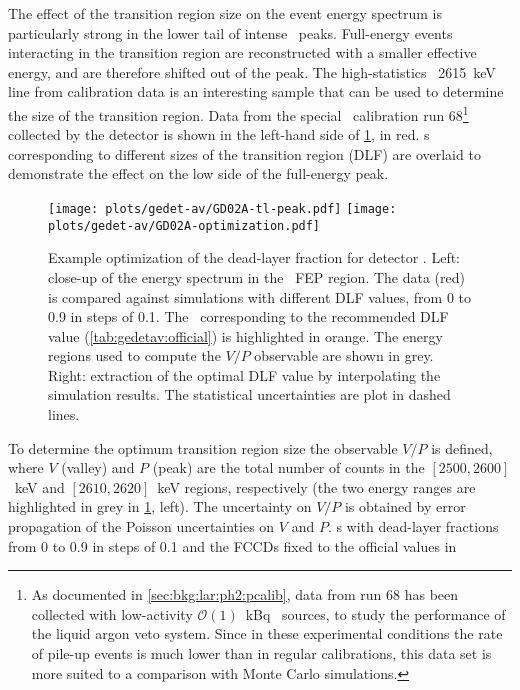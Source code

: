 The effect of the transition region size on the event energy spectrum is particularly
strong in the lower tail of intense \g\ peaks. Full-energy events interacting in the
transition region are reconstructed with a smaller effective energy, and are therefore
shifted out of the peak. The high-statistics \Tl\ 2615~keV line from calibration data is
an interesting sample that can be used to determine the size of the transition region.
Data from the special \Th\ calibration run 68\footnote{%
  As documented in \cref{sec:bkg:lar:ph2:pcalib}, data from run 68 has been collected with
  low-activity $\mathcal{O}(1)$~kBq \Th\ sources, to study the performance of the liquid
  argon veto system. Since in these experimental conditions the rate of pile-up events is
  much lower than in regular calibrations, this data set is more suited to a comparison
  with Monte Carlo simulations.
} collected by the  detector is shown in the left-hand side of
\cref{fig:gedetav:calib-optim-example}, in red. \pdf{}s corresponding to different sizes of
the transition region (DLF) are overlaid to demonstrate the effect on the low side of the
full-energy peak.
\begin{figure}
  \centering
  \texttt{[image: plots/gedet-av/GD02A-tl-peak.pdf]}%
  \hspace{0.07\textwidth}%
  \texttt{[image: plots/gedet-av/GD02A-optimization.pdf]}
  \caption{%
    Example optimization of the dead-layer fraction for detector . Left: close-up
    of the energy spectrum in the \Tl\ FEP region. The data (red) is compared against
    simulations with different DLF values, from 0 to 0.9 in steps of 0.1. The \pdf\
    corresponding to the recommended DLF value (\cref{tab:gedetav:official}) is
    highlighted in orange. The energy regions used to compute the $V/P$ observable are
    shown in grey. Right: extraction of the optimal DLF value by interpolating the
    simulation results. The statistical uncertainties are plot in dashed lines.
  }\label{fig:gedetav:calib-optim-example}
\end{figure}
\newpar
To determine the optimum transition region size the observable $V/P$ is defined, where $V$
(valley) and $P$ (peak) are the total number of counts in the $[2500, 2600]$~keV and
$[2610, 2620]$~keV regions, respectively (the two energy ranges are highlighted in grey in
\cref{fig:gedetav:calib-optim-example}, left). The uncertainty on $V/P$ is obtained by
error propagation of the Poisson uncertainties on $V$ and $P$. \pdf{}s with dead-layer
fractions from 0 to 0.9 in steps of 0.1 and the FCCDs fixed to the official values in
